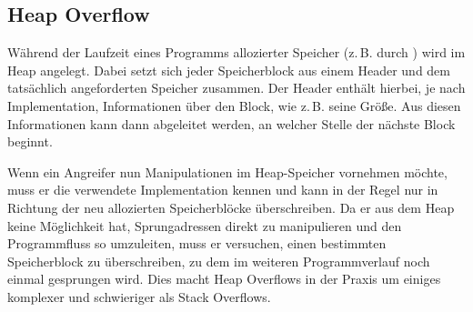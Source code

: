 \subsection{Heap Overflow}
Während der Laufzeit eines Programms allozierter Speicher (z.\,B. durch ) wird im Heap angelegt. Dabei setzt sich
jeder Speicherblock aus einem Header und dem tatsächlich angeforderten Speicher zusammen. Der Header enthält hierbei,
je nach Implementation, Informationen über den Block, wie z.\,B. seine Größe. Aus diesen Informationen kann dann abgeleitet
werden, an welcher Stelle der nächste Block beginnt.

Wenn ein Angreifer nun Manipulationen im Heap-Speicher vornehmen möchte, muss er die verwendete Implementation kennen
und kann in der Regel nur in Richtung der neu allozierten Speicherblöcke überschreiben. Da er aus dem Heap keine Möglichkeit
hat, Sprungadressen direkt zu manipulieren und den Programmfluss so umzuleiten, muss er versuchen, einen bestimmten
Speicherblock zu überschreiben, zu dem im weiteren Programmverlauf noch einmal gesprungen wird. Dies macht Heap Overflows
in der Praxis um einiges komplexer und schwieriger als Stack Overflows. \cite{heise}

